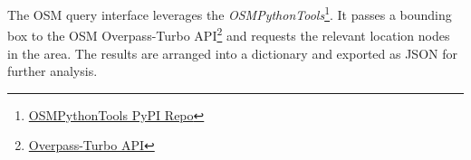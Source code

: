 The OSM query interface leverages the \textit{OSMPythonTools}\footnote{\href{https://pypi.org/project/OSMPythonTools/}{OSMPythonTools PyPI Repo}}. It passes a bounding box to the OSM Overpass-Turbo API\footnote{\href{https://overpass-turbo.eu/}{Overpass-Turbo API}} and requests the relevant location nodes in the area. 
The results are arranged into a dictionary and exported as JSON for further analysis.

